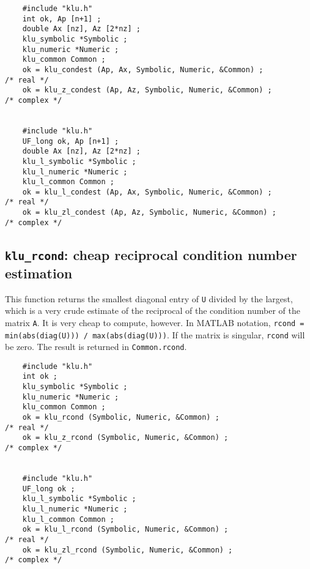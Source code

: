 \documentclass[11pt]{article}
\begin{document}
{\footnotesize
\begin{verbatim}
    #include "klu.h"
    int ok, Ap [n+1] ;
    double Ax [nz], Az [2*nz] ;
    klu_symbolic *Symbolic ;
    klu_numeric *Numeric ;
    klu_common Common ;
    ok = klu_condest (Ap, Ax, Symbolic, Numeric, &Common) ;                           /* real */
    ok = klu_z_condest (Ap, Az, Symbolic, Numeric, &Common) ;                         /* complex */


    #include "klu.h"
    UF_long ok, Ap [n+1] ;
    double Ax [nz], Az [2*nz] ;
    klu_l_symbolic *Symbolic ;
    klu_l_numeric *Numeric ;
    klu_l_common Common ;
    ok = klu_l_condest (Ap, Ax, Symbolic, Numeric, &Common) ;                         /* real */
    ok = klu_zl_condest (Ap, Az, Symbolic, Numeric, &Common) ;                        /* complex */
\end{verbatim}
}


\subsection{{\tt klu\_rcond}: cheap reciprocal condition number estimation}

This function returns the smallest diagonal entry of {\tt U} divided by the
largest, which is a very crude estimate of the reciprocal of the condition
number of the matrix {\tt A}.  It is very cheap to compute, however.
In MATLAB notation, {\tt rcond = min(abs(diag(U))) / max(abs(diag(U)))}.
If the matrix is singular, {\tt rcond} will be zero.  The result is returned
in {\tt Common.rcond}.


{\footnotesize
\begin{verbatim}
    #include "klu.h"
    int ok ;
    klu_symbolic *Symbolic ;
    klu_numeric *Numeric ;
    klu_common Common ;
    ok = klu_rcond (Symbolic, Numeric, &Common) ;                                     /* real */
    ok = klu_z_rcond (Symbolic, Numeric, &Common) ;                                   /* complex */


    #include "klu.h"
    UF_long ok ;
    klu_l_symbolic *Symbolic ;
    klu_l_numeric *Numeric ;
    klu_l_common Common ;
    ok = klu_l_rcond (Symbolic, Numeric, &Common) ;                                   /* real */
    ok = klu_zl_rcond (Symbolic, Numeric, &Common) ;                                  /* complex */
\end{verbatim}
}
\end{document}
